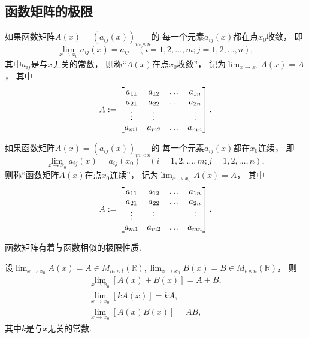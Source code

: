 \subsection{函数矩阵的极限}
\begin{definition}
如果函数矩阵\(A(x) = (a_{ij}(x))_{m \times n}\)的
每一个元素\(a_{ij}(x)\)都在点\(x_0\)收敛，
即\begin{equation*}
	\lim_{x \to x_0} a_{ij}(x)
	= a_{ij}
	\quad(i=1,2,\dotsc,m;j=1,2,\dotsc,n),
\end{equation*}
其中\(a_{ij}\)是与\(x\)无关的常数，
则称“\(A(x)\)在点\(x_0\)收敛”，
记为\(\lim_{x \to x_0} A(x) = A\)，
其中\begin{equation*}
	A := \begin{bmatrix}
		a_{11} & a_{12} & \dots & a_{1n} \\
		a_{21} & a_{22} & \dots & a_{2n} \\
		\vdots & \vdots & & \vdots \\
		a_{m1} & a_{m2} & \dots & a_{mn} \\
	\end{bmatrix}.
\end{equation*}
\end{definition}

\begin{definition}
如果函数矩阵\(A(x) = (a_{ij}(x))_{m \times n}\)的
每一个元素\(a_{ij}(x)\)都在\(x_0\)连续，
即\begin{equation*}
	\lim_{x \to x_0} a_{ij}(x)
	= a_{ij}(x_0)
	\quad(i=1,2,\dotsc,m;j=1,2,\dotsc,n),
\end{equation*}
则称“函数矩阵\(A(x)\)在点\(x_0\)连续”，
记为\(\lim_{x \to x_0} A(x) = A\)，
其中\begin{equation*}
	A := \begin{bmatrix}
		a_{11} & a_{12} & \dots & a_{1n} \\
		a_{21} & a_{22} & \dots & a_{2n} \\
		\vdots & \vdots & & \vdots \\
		a_{m1} & a_{m2} & \dots & a_{mn} \\
	\end{bmatrix}.
\end{equation*}
\end{definition}

函数矩阵有着与函数相似的极限性质.
\begin{property}
设\(
	\lim_{x \to x_0} A(x) = A \in M_{m \times t}(\mathbb{R}),
	\lim_{x \to x_0} B(x) = B \in M_{t \times n}(\mathbb{R})
\)，
则\begin{gather*}
	\lim_{x \to x_0} [ A(x) \pm B(x) ]
	= A \pm B, \\
	\lim_{x \to x_0} [ k A(x) ]
	= k A, \\
	\lim_{x \to x_0} [ A(x) B(x) ]
	= A B,
\end{gather*}
其中\(k\)是与\(x\)无关的常数.
\end{property}

